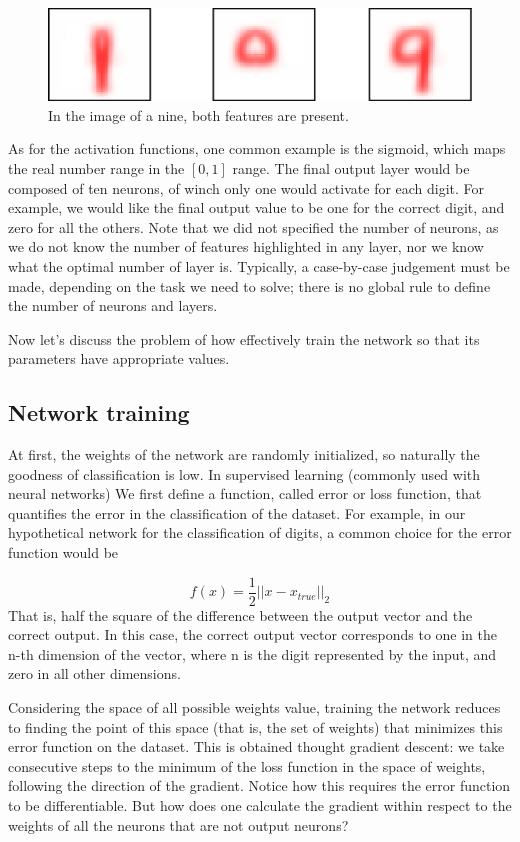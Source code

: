 \documentclass[a4paper]{report}
\begin{document}
\begin{figure} [H]
\centering
\includegraphics [width=\textwidth] {o/features.png}
\caption{In the image of a nine, both features are present.}
\end{figure}
As for the activation functions, one common example is the sigmoid, which maps the real number range in the $[0,1]$ range.
The final output layer would be composed of ten neurons, of winch only one would activate for each digit.
For example, we would like the final output value to be one for the correct digit, and zero for all the others.
Note that we did not specified the number of neurons, as we do not know the number of features highlighted in any layer, nor we know what the optimal number of layer is.
Typically, a case-by-case judgement must be made, depending on the task we need to solve;
there is no global rule to define the number of neurons and layers.

Now let's discuss the problem of how effectively train the network so that its parameters have appropriate values.
\subsection{Network training}
At first, the weights of the network are randomly initialized, so naturally the goodness of classification is low.
In supervised learning (commonly used with neural networks) We first define a function, called error or loss function, that quantifies the error in the classification of the dataset.
For example, in our hypothetical network for the classification of digits, a common choice for the error function would be

\begin{equation}
f(x)=\frac{1}{2}||x-x_{true}||_2
\label{true}
\end{equation}
That is, half the square of the difference between the output vector and the correct output.
In this case, the correct output vector corresponds to one in the n-th dimension of the vector, where n is the digit represented by the input, and zero in all other dimensions.

Considering the space of all possible weights value, training the network reduces to finding the point of this space (that is, the set of weights) that minimizes this error function on the dataset.
This is obtained thought gradient descent:
we take consecutive steps to the minimum of the loss function in the space of weights, following the direction of the gradient.
Notice how this requires the error function to be differentiable.
But how does one calculate the gradient within respect to the weights of all the neurons that are not output neurons?
\end{document}
